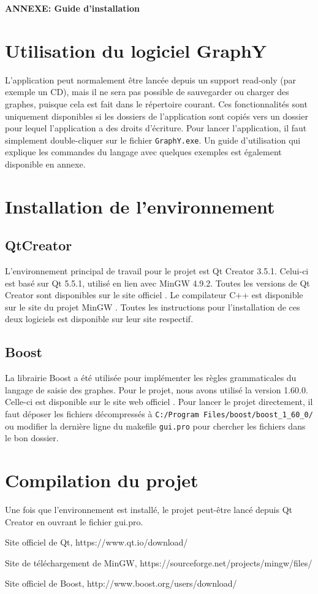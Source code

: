 \documentclass[french]{article}
\begin{document}
	\centering
	\large{\textbf{ANNEXE: Guide d'installation}}
	
	\justifying
	\normalsize
	
	\section{Utilisation du logiciel GraphY}
	L'application peut normalement être lancée depuis un support read-only (par exemple un CD), mais il ne sera pas possible de sauvegarder ou charger des graphes, puisque cela est fait dans le répertoire courant. Ces fonctionnalités sont uniquement disponibles si les dossiers de l'application sont copiés vers un dossier pour lequel l'application a des droits d'écriture. Pour lancer l'application, il faut simplement double-cliquer sur le fichier \texttt{GraphY.exe}. Un guide d'utilisation qui explique les commandes du langage avec quelques exemples est également disponible en annexe.
	
	\section{Installation de l'environnement}
		\subsection{QtCreator}
		L'environnement principal de travail pour le projet est Qt Creator 3.5.1. Celui-ci est basé sur Qt 5.5.1, utilisé en lien avec MinGW 4.9.2. Toutes les versions de Qt Creator sont disponibles sur le site officiel \cite{qt}. Le compilateur C++ est disponible sur le site du projet MinGW \cite{minGW}. Toutes les instructions pour l'installation de ces deux logiciels est disponible sur leur site respectif.
	
		\subsection{Boost}
		La librairie Boost a été utilisée pour implémenter les règles grammaticales du langage de saisie des graphes. Pour le projet, nous avons utilisé la version 1.60.0. Celle-ci est disponible sur le site web officiel \cite{boost}. Pour lancer le projet directement, il faut déposer les fichiers décompressés à \texttt{C:/Program Files/boost/boost\_1\_60\_0/} ou modifier la dernière ligne du makefile \texttt{gui.pro} pour chercher les fichiers dans le bon dossier.
	
	\section{Compilation du projet}
	Une fois que l'environnement est installé, le projet peut-être lancé depuis Qt Creator en ouvrant le fichier gui.pro.
	
	\begin{thebibliography}{9}
		Site officiel de Qt, https://www.qt.io/download/
		
		Site de téléchargement de MinGW, https://sourceforge.net/projects/mingw/files/
		
		Site officiel de Boost, http://www.boost.org/users/download/
	\end{thebibliography}
	
\end{document}
